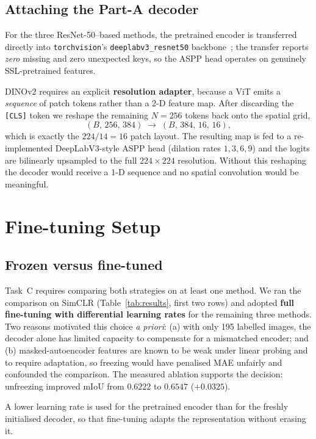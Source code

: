 \documentclass[conference]{IEEEtran}
\begin{document}
\subsection{Attaching the Part-A decoder}
For the three ResNet-50--based methods, the pretrained encoder is transferred
directly into \texttt{torchvision}'s \texttt{deeplabv3\_resnet50} backbone~\cite{torchvision}; the
transfer reports \emph{zero} missing and zero unexpected keys, so the ASPP head
operates on genuinely SSL-pretrained features.

DINOv2 requires an explicit \textbf{resolution adapter}, because a ViT emits a
\emph{sequence} of patch tokens rather than a 2-D feature map. After discarding the
\texttt{[CLS]} token we reshape the remaining $N=256$ tokens back onto the spatial
grid,
\[
(B,\,256,\,384) \;\longrightarrow\; (B,\,384,\,16,\,16),
\]
which is exactly the $224/14 = 16$ patch layout. The resulting map is fed to a
re-implemented DeepLabV3-style ASPP head (dilation rates $1,3,6,9$) and the logits
are bilinearly upsampled to the full $224\times224$ resolution. Without this
reshaping the decoder would receive a 1-D sequence and no spatial convolution would
be meaningful.

\section{Fine-tuning Setup}

\subsection{Frozen versus fine-tuned}
Task~C requires comparing both strategies on at least one method. We ran the
comparison on SimCLR (Table~\ref{tab:results}, first two rows) and adopted
\textbf{full fine-tuning with differential learning rates} for the remaining three
methods. Two reasons motivated this choice \emph{a priori}: (a) with only 195
labelled images, the decoder alone has limited capacity to compensate for a
mismatched encoder; and (b) masked-autoencoder features are known to be weak under
linear probing and to require adaptation, so freezing would have penalised MAE
unfairly and confounded the comparison. The measured ablation supports the decision:
unfreezing improved mIoU from $0.6222$ to $0.6547$ ($+0.0325$).

A lower learning rate is used for the pretrained encoder than for the freshly
initialised decoder, so that fine-tuning adapts the representation without erasing
it.
\end{document}
